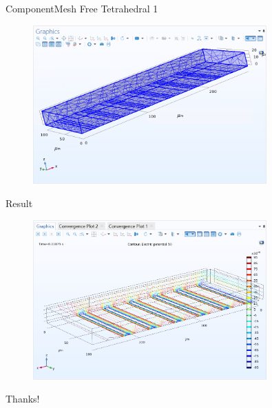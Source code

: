 \documentclass[10pt]{beamer}
\begin{document}
\begin{frame}{Component}{Mesh}
    Free Tetrahedral 1
    \begin{figure}[H]
        \centering
        \includegraphics[width=0.8\textwidth]{8.png}
    \end{figure}
\end{frame}
\begin{frame}{Result}
    \begin{figure}[H]
        \centering
        \includegraphics[width=0.8\textwidth]{9.png}
    \end{figure}
\end{frame}
\begin{frame}
    \begin{center}
        Thanks!
    \end{center}
\end{frame}
\end{document}

